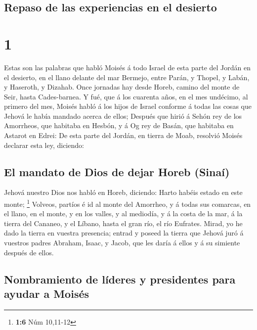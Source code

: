 \hypertarget{repaso-de-las-experiencias-en-el-desierto}{%
\subsection{Repaso de las experiencias en el
desierto}\label{repaso-de-las-experiencias-en-el-desierto}}

\hypertarget{section}{%
\section{1}\label{section}}

 Estas son las palabras que habló Moisés á todo Israel de
esta parte del Jordán en el desierto, en el llano delante del mar
Bermejo, entre Parán, y Thopel, y Labán, y Haseroth, y Dizahab.
 Once jornadas hay desde Horeb, camino del monte de Seir,
hasta Cades-barnea.  Y fué, que á los cuarenta años, en el
mes undécimo, al primero del mes, Moisés habló á los hijos de Israel
conforme á todas las cosas que Jehová le había mandado acerca de ellos;
 Después que hirió á Sehón rey de los Amorrheos, que
habitaba en Hesbón, y á Og rey de Basán, que habitaba en Astarot en
Edrei:  De esta parte del Jordán, en tierra de Moab,
resolvió Moisés declarar esta ley, diciendo:

\hypertarget{el-mandato-de-dios-de-dejar-horeb-sinauxed}{%
\subsection{El mandato de Dios de dejar Horeb
(Sinaí)}\label{el-mandato-de-dios-de-dejar-horeb-sinauxed}}

 Jehová nuestro Dios nos habló en Horeb, diciendo: Harto
habéis estado en este monte; \footnote{\textbf{1:6} Núm 10,11-12}
 Volveos, partíos é id al monte del Amorrheo, y á todas sus
comarcas, en el llano, en el monte, y en los valles, y al mediodía, y á
la costa de la mar, á la tierra del Cananeo, y el Líbano, hasta el gran
río, el río Eufrates.  Mirad, yo he dado la tierra en
vuestra presencia; entrad y poseed la tierra que Jehová juró á vuestros
padres Abraham, Isaac, y Jacob, que les daría á ellos y á su simiente
después de ellos.

\hypertarget{nombramiento-de-luxedderes-y-presidentes-para-ayudar-a-moisuxe9s}{%
\subsection{Nombramiento de líderes y presidentes para ayudar a
Moisés}\label{nombramiento-de-luxedderes-y-presidentes-para-ayudar-a-moisuxe9s}}

